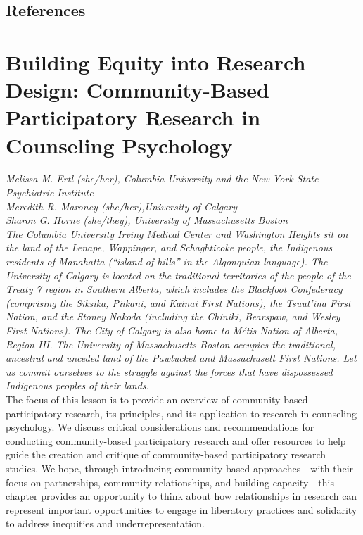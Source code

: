 \documentclass[
  11pt,
]{book}
\begin{document}
\hypertarget{references}{%
\section{References}\label{references}}

\hypertarget{ComRes}{%
\chapter{Building Equity into Research Design: Community-Based Participatory Research in Counseling Psychology}\label{ComRes}}

\emph{Melissa M. Ertl (she/her), Columbia University and the New York State Psychiatric Institute}\\
\emph{Meredith R. Maroney (she/her),University of Calgary}\\
\emph{Sharon G. Horne (she/they), University of Massachusetts Boston}\\
\emph{The Columbia University Irving Medical Center and Washington Heights sit on the land of the Lenape, Wappinger, and Schaghticoke people, the Indigenous residents of Manahatta (``island of hills'' in the Algonquian language). The University of Calgary is located on the traditional territories of the people of the Treaty 7 region in Southern Alberta, which includes the Blackfoot Confederacy (comprising the Siksika, Piikani, and Kainai First Nations), the Tsuut'ina First Nation, and the Stoney Nakoda (including the Chiniki, Bearspaw, and Wesley First Nations). The City of Calgary is also home to Métis Nation of Alberta, Region III. The University of Massachusetts Boston occupies the traditional, ancestral and unceded land of the Pawtucket and Massachusett First Nations. Let us commit ourselves to the struggle against the forces that have dispossessed Indigenous peoples of their lands.}\\

The focus of this lesson is to provide an overview of community-based participatory research, its principles, and its application to research in counseling psychology. We discuss critical considerations and recommendations for conducting community-based participatory research and offer resources to help guide the creation and critique of community-based participatory research studies. We hope, through introducing community-based approaches---with their focus on partnerships, community relationships, and building capacity---this chapter provides an opportunity to think about how relationships in research can represent important opportunities to engage in liberatory practices and solidarity to address inequities and underrepresentation.
\end{document}
